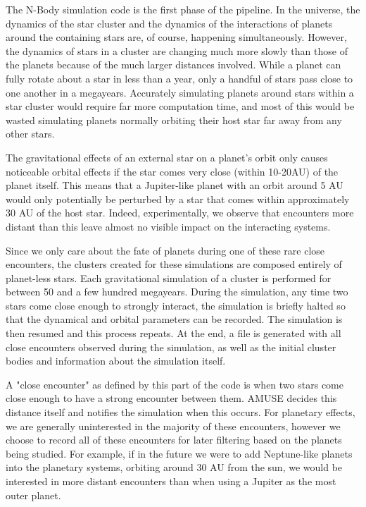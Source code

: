 \documentclass[12pt]{article}
\begin{document}
    The N-Body simulation code is the first phase of the pipeline. In the
    universe, the dynamics of the star cluster and the dynamics of the
    interactions of planets around the containing stars are, of course, happening
    simultaneously. However, the dynamics of stars in a cluster are changing much
    more slowly than those of the planets because of the much larger distances
    involved. While a planet can fully rotate about a star in less than a year,
    only a handful of stars pass close to one another in a megayears. Accurately
    simulating planets around stars within a star cluster would require
    far more computation time, and most of this would be wasted simulating
    planets normally orbiting their host star far away from any other stars.

    The gravitational effects of an external star on a planet's orbit only
    causes noticeable orbital effects if the star comes very close (within 10-20AU)
    of the planet itself. This means that a Jupiter-like planet with an orbit around
    5 AU would only potentially be perturbed by a star that comes within 
    approximately 30 AU of the host star. Indeed, experimentally, we observe that
    encounters more distant than this leave almost no visible impact on the
    interacting systems. 

    Since we only care about the fate of planets during one of these 
    rare close encounters,
    the clusters created for these simulations are composed entirely of planet-less stars.
    Each gravitational simulation of a cluster is performed for between 50 
    and a few hundred megayears. During the simulation, any time two stars
    come close enough to strongly interact, the simulation is briefly halted so that
    the dynamical and orbital parameters can be recorded. The simulation is then
    resumed and this process repeats. At the end, a file is generated with
    all close encounters observed during the simulation, as well as the initial
    cluster bodies and information about the simulation itself.

    A "close encounter" as defined by this part of the code is when two stars
    come close enough to have a strong encounter between them. AMUSE decides
    this distance itself and notifies the simulation when this occurs. For planetary
    effects, we are generally uninterested in the majority of these encounters, however
    we choose to record all of these encounters for later filtering based on the
    planets being studied. For example, if in the future we were to add Neptune-like
    planets into the planetary systems, orbiting around 30 AU from the sun, we would
    be interested in more distant encounters than when using a Jupiter as the most
    outer planet.
\end{document}
